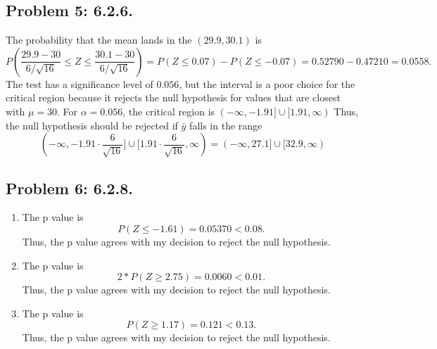 \documentclass{article}
\begin{document}
\subsection*{Problem 5: 6.2.6.}
The probability that the mean lands in the $(29.9, 30.1)$ is
\[
	P(\frac{29.9-30}{6/\sqrt{16}} \leq Z \leq \frac{30.1-30}{6/\sqrt{16}}) = 
	P (Z \leq 0.07) - P(Z \leq -0.07) = 
	0.52790 - 0.47210 = 0.0558.
\]
The test has a significance level of $0.056$, but the interval is a poor choice
for the critical region because it rejects the null hypothesis for values
that are closest with $\mu = 30$. For $\alpha=0.056$, the critical region is 
$(-\infty,-1.91]\cup [1.91,\infty)$
Thus, the null hypothesis should be rejected if $\bar{y}$ falls in the range
\[
	(-\infty,-1.91\cdot \frac{6}{\sqrt{16}}]\cup [1.91\cdot \frac{6}{\sqrt{16}},\infty)
	=(-\infty,27.1]\cup [32.9,\infty)
\]
\newpage

\subsection*{Problem 6: 6.2.8.}
\begin{enumerate}
	\item The p value is 
	\[
		P(Z \leq -1.61) = 0.05370 < 0.08.
	\]
	Thus, the p value agrees with my decision to reject the null hypothesis.
	\item The p value is 
	\[
		2*P(Z \geq 2.75) = 0.0060 < 0.01.
	\]
	Thus, the p value agrees with my decision to reject the null hypothesis.
	\item The p value is 
	\[
		P(Z \geq 1.17) = 0.121 < 0.13.
	\]
	Thus, the p value agrees with my decision to reject the null hypothesis.
\end{enumerate}
\end{document}
